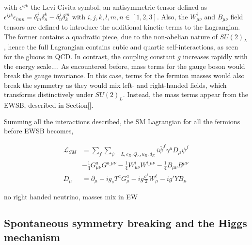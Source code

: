 with $\epsilon^{ijk}$ the Levi-Civita symbol, an antisymmetric tensor defined as $\epsilon^{ijk}\epsilon_{imn}=\delta^j_m\delta^k_n-\delta^j_n\delta^m_k$ with $i,j,k,l,m,n\in[1,2,3]$. Also, the $W_{\mu\nu}^i$ and $B_{\mu\nu}$ field tensors are defined to introduce the additional kinetic terms to the Lagrangian. The former contains a quadratic piece, due to the non-abelian nature of $SU(2)_L$, hence the full Lagrangian contains cubic and quartic self-interactions, as seen for the gluons in QCD. In contrast, the coupling constant $g$ increases rapidly with the energy scale.... As encountered before, mass terms for the gauge boson would break the gauge invariance. In this case, terms for the fermion masses would also break the symmetry as they would mix left- and right-handed fields, which transforms distinctively under $SU(2)_L$. Instead, the mass terms appear from the EWSB, described in Section[].

Summing all the interactions described, the SM Lagrangian for all the fermions before EWSB becomes,

\begin{equation}
    \label{Theory_eq:SMbeforeEWSB}
    \begin{split}
    \mathcal{L}_{SM} &= \sum_f\sum_{\psi=L,e_R,Q_L,u_R,d_R} i\bar{\psi}^f\gamma^\mu D_\mu \psi^f\\
    &- \frac{1}{4}G^a_{\mu\nu}G^{a\_\mu\nu} - \frac{1}{4}W^i_{\mu\nu}W^{i\_\mu\nu} - \frac{1}{4}B_{\mu\nu}B^{\mu\nu}\\
    D_\mu &= \partial_\mu - i g_s T^a G^a_\mu - i g \frac{\sigma^i}{2}W_\mu^i - ig'YB_\mu 
    \end{split}
\end{equation}

no right handed neutrino, masses mix in EW

\subsection{Spontaneous symmetry breaking and the Higgs mechanism}

